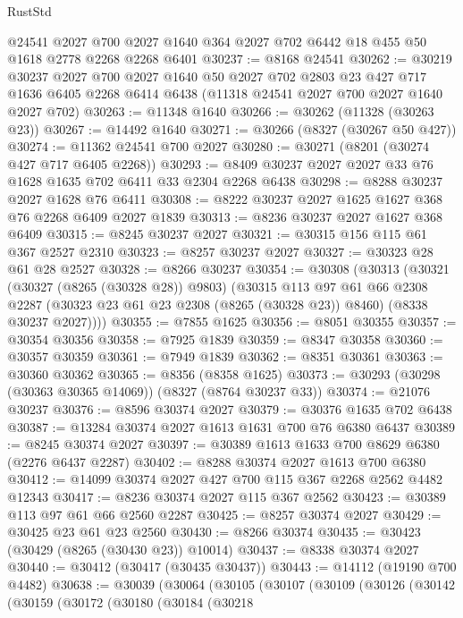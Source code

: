 \begin{lexlean}{RustStd}
\begin{coremodule}
{\begin{coremodule}
{{{{{{{{{{{{{{{{{{{{{{{{{{{{{{{{{{{{{{{{{{{{{{{{{{{{{{    @24541
    @2027
    @700
    @2027
    @1640
    @364
    @2027
    @702
    @6442
    @18
    @455
    @50
    @1618
    @2778
    @2268
    @2268
    @6401
@30237 := @8168 @24541
@30262 := @30219
    @30237
    @2027
    @700
    @2027
    @1640
    @50
    @2027
    @702
    @2803
    @23
    @427
    @717
    @1636
    @6405
    @2268
    @6414
    @6438
    (@11318 @24541 @2027 @700 @2027 @1640 @2027 @702)
@30263 := @11348 @1640
@30266 := @30262 (@11328 (@30263 @23))
@30267 := @14492 @1640
@30271 := @30266 (@8327 (@30267 @50 @427))
@30274 := @11362 @24541 @700 @2027
@30280 := @30271 (@8201 (@30274 @427 @717 @6405 @2268))
@30293 := @8409 @30237 @2027 @2027 @33 @76 @1628 @1635 @702 @6411 @33 @2304 @2268 @6438
@30298 := @8288 @30237 @2027 @1628 @76 @6411
@30308 := @8222 @30237 @2027 @1625 @1627 @368 @76 @2268 @6409 @2027 @1839
@30313 := @8236 @30237 @2027 @1627 @368 @6409
@30315 := @8245 @30237 @2027
@30321 := @30315 @156 @115 @61 @367 @2527 @2310
@30323 := @8257 @30237 @2027
@30327 := @30323 @28 @61 @28 @2527
@30328 := @8266 @30237
@30354 := @30308
    (@30313
      (@30321
        (@30327 (@8265 (@30328 @28)) @9803)
        (@30315
          @113
          @97
          @61
          @66
          @2308
          @2287
          (@30323 @23 @61 @23 @2308 (@8265 (@30328 @23)) @8460)
          (@8338 @30237 @2027))))
@30355 := @7855 @1625
@30356 := @8051 @30355
@30357 := @30354 @30356
@30358 := @7925 @1839
@30359 := @8347 @30358
@30360 := @30357 @30359
@30361 := @7949 @1839
@30362 := @8351 @30361
@30363 := @30360 @30362
@30365 := @8356 (@8358 @1625)
@30373 := @30293 (@30298 (@30363 @30365 @14069)) (@8327 (@8764 @30237 @33))
@30374 := @21076 @30237
@30376 := @8596 @30374 @2027
@30379 := @30376 @1635 @702 @6438
@30387 := @13284 @30374 @2027 @1613 @1631 @700 @76 @6380 @6437
@30389 := @8245 @30374 @2027
@30397 := @30389 @1613 @1633 @700 @8629 @6380 (@2276 @6437 @2287)
@30402 := @8288 @30374 @2027 @1613 @700 @6380
@30412 := @14099 @30374 @2027 @427 @700 @115 @367 @2268 @2562 @4482 @12343
@30417 := @8236 @30374 @2027 @115 @367 @2562
@30423 := @30389 @113 @97 @61 @66 @2560 @2287
@30425 := @8257 @30374 @2027
@30429 := @30425 @23 @61 @23 @2560
@30430 := @8266 @30374
@30435 := @30423 (@30429 (@8265 (@30430 @23)) @10014)
@30437 := @8338 @30374 @2027
@30440 := @30412 (@30417 (@30435 @30437))
@30443 := @14112 (@19190 @700 @4482)
@30638 := @30039
    (@30064
      (@30105
        (@30107
          (@30109
            (@30126
              (@30142
                (@30159
                  (@30172
                    (@30180
                      (@30184
                        (@30218
}}}}}}}}}}}}}}}}}}}}}}}}}}}}}}}}}}}}}}}}}}}}}}}}}}}}}}
\end{coremodule}}
\end{coremodule}
\end{lexlean}
